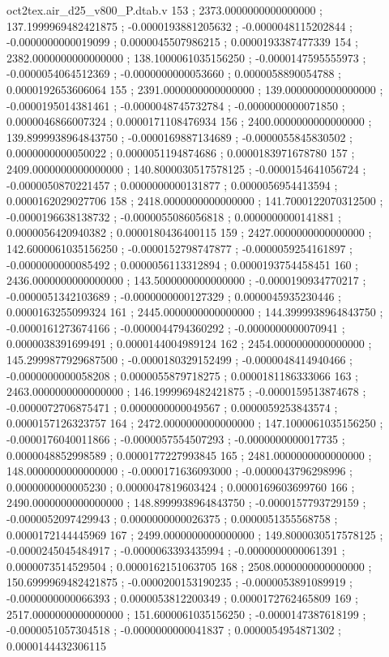 \begin{filecontents}[overwrite]{oct2tex.air_d25_v800_P.dtab.v}
153 ; 2373.0000000000000000 ; 137.1999969482421875 ; -0.0000193881205632 ; -0.0000048115202844 ; -0.0000000000019099 ; 0.0000045507986215 ; 0.0000193387477339
154 ; 2382.0000000000000000 ; 138.1000061035156250 ; -0.0000147595555973 ; -0.0000054064512369 ; -0.0000000000053660 ; 0.0000058890054788 ; 0.0000192653606064
155 ; 2391.0000000000000000 ; 139.0000000000000000 ; -0.0000195014381461 ; -0.0000048745732784 ; -0.0000000000071850 ; 0.0000046866007324 ; 0.0000171108476934
156 ; 2400.0000000000000000 ; 139.8999938964843750 ; -0.0000169887134689 ; -0.0000055845830502 ; 0.0000000000050022 ; 0.0000051194874686 ; 0.0000183971678780
157 ; 2409.0000000000000000 ; 140.8000030517578125 ; -0.0000154641056724 ; -0.0000050870221457 ; 0.0000000000131877 ; 0.0000056954413594 ; 0.0000162029027706
158 ; 2418.0000000000000000 ; 141.7000122070312500 ; -0.0000196638138732 ; -0.0000055086056818 ; 0.0000000000141881 ; 0.0000056420940382 ; 0.0000180436400115
159 ; 2427.0000000000000000 ; 142.6000061035156250 ; -0.0000152798747877 ; -0.0000059254161897 ; -0.0000000000085492 ; 0.0000056113312894 ; 0.0000193754458451
160 ; 2436.0000000000000000 ; 143.5000000000000000 ; -0.0000190934770217 ; -0.0000051342103689 ; -0.0000000000127329 ; 0.0000045935230446 ; 0.0000163255099324
161 ; 2445.0000000000000000 ; 144.3999938964843750 ; -0.0000161273674166 ; -0.0000044794360292 ; -0.0000000000070941 ; 0.0000038391699491 ; 0.0000144004989124
162 ; 2454.0000000000000000 ; 145.2999877929687500 ; -0.0000180329152499 ; -0.0000048414940466 ; -0.0000000000058208 ; 0.0000055879718275 ; 0.0000181186333066
163 ; 2463.0000000000000000 ; 146.1999969482421875 ; -0.0000159513874678 ; -0.0000072706875471 ; 0.0000000000049567 ; 0.0000059253843574 ; 0.0000157126323757
164 ; 2472.0000000000000000 ; 147.1000061035156250 ; -0.0000176040011866 ; -0.0000057554507293 ; -0.0000000000017735 ; 0.0000048852998589 ; 0.0000177227993845
165 ; 2481.0000000000000000 ; 148.0000000000000000 ; -0.0000171636093000 ; -0.0000043796298996 ; 0.0000000000005230 ; 0.0000047819603424 ; 0.0000169603699760
166 ; 2490.0000000000000000 ; 148.8999938964843750 ; -0.0000157793729159 ; -0.0000052097429943 ; 0.0000000000026375 ; 0.0000051355568758 ; 0.0000172144445969
167 ; 2499.0000000000000000 ; 149.8000030517578125 ; -0.0000245045484917 ; -0.0000063393435994 ; -0.0000000000061391 ; 0.0000073514529504 ; 0.0000162151063705
168 ; 2508.0000000000000000 ; 150.6999969482421875 ; -0.0000200153190235 ; -0.0000053891089919 ; -0.0000000000066393 ; 0.0000053812200349 ; 0.0000172762465809
169 ; 2517.0000000000000000 ; 151.6000061035156250 ; -0.0000147387618199 ; -0.0000051057304518 ; -0.0000000000041837 ; 0.0000054954871302 ; 0.0000144432306115

\end{filecontents}
